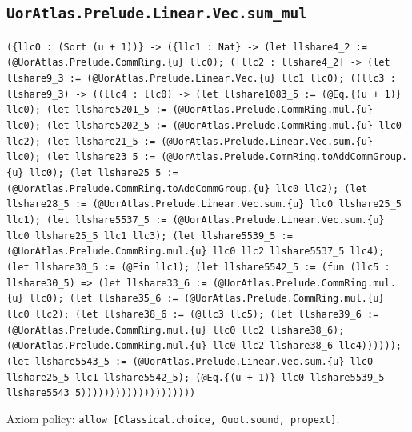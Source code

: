 \documentclass[11pt]{article}
\begin{document}
\subsection*{\texttt{UorAtlas.Prelude.Linear.Vec.sum\_mul}}
\noindent\texttt{(\{llc0 : (Sort (u + 1))\} -> (\{llc1 : Nat\} -> (let llshare4\_2 := (@UorAtlas.Prelude.CommRing.\{u\} llc0); ([llc2 : llshare4\_2] -> (let llshare9\_3 := (@UorAtlas.Prelude.Linear.Vec.\{u\} llc1 llc0); ((llc3 : llshare9\_3) -> ((llc4 : llc0) -> (let llshare1083\_5 := (@Eq.\{(u + 1)\} llc0); (let llshare5201\_5 := (@UorAtlas.Prelude.CommRing.mul.\{u\} llc0); (let llshare5202\_5 := (@UorAtlas.Prelude.CommRing.mul.\{u\} llc0 llc2); (let llshare21\_5 := (@UorAtlas.Prelude.Linear.Vec.sum.\{u\} llc0); (let llshare23\_5 := (@UorAtlas.Prelude.CommRing.toAddCommGroup.\{u\} llc0); (let llshare25\_5 := (@UorAtlas.Prelude.CommRing.toAddCommGroup.\{u\} llc0 llc2); (let llshare28\_5 := (@UorAtlas.Prelude.Linear.Vec.sum.\{u\} llc0 llshare25\_5 llc1); (let llshare5537\_5 := (@UorAtlas.Prelude.Linear.Vec.sum.\{u\} llc0 llshare25\_5 llc1 llc3); (let llshare5539\_5 := (@UorAtlas.Prelude.CommRing.mul.\{u\} llc0 llc2 llshare5537\_5 llc4); (let llshare30\_5 := (@Fin llc1); (let llshare5542\_5 := (fun (llc5 : llshare30\_5) => (let llshare33\_6 := (@UorAtlas.Prelude.CommRing.mul.\{u\} llc0); (let llshare35\_6 := (@UorAtlas.Prelude.CommRing.mul.\{u\} llc0 llc2); (let llshare38\_6 := (@llc3 llc5); (let llshare39\_6 := (@UorAtlas.Prelude.CommRing.mul.\{u\} llc0 llc2 llshare38\_6); (@UorAtlas.Prelude.CommRing.mul.\{u\} llc0 llc2 llshare38\_6 llc4)))))); (let llshare5543\_5 := (@UorAtlas.Prelude.Linear.Vec.sum.\{u\} llc0 llshare25\_5 llc1 llshare5542\_5); (@Eq.\{(u + 1)\} llc0 llshare5539\_5 llshare5543\_5))))))))))))))))))))}\par
\noindent Axiom policy: \texttt{allow [Classical.choice, Quot.sound, propext]}.\par
\end{document}
